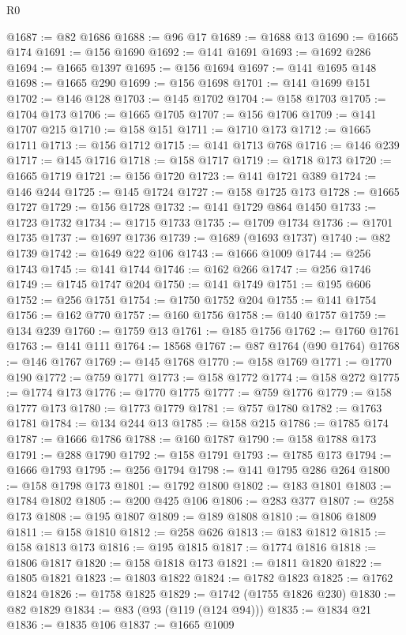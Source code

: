 \begin{lexlean}{R0}
\begin{coremodule}
@1687 := @82 @1686
@1688 := @96 @17
@1689 := @1688 @13
@1690 := @1665 @174
@1691 := @156 @1690
@1692 := @141 @1691
@1693 := @1692 @286
@1694 := @1665 @1397
@1695 := @156 @1694
@1697 := @141 @1695 @148
@1698 := @1665 @290
@1699 := @156 @1698
@1701 := @141 @1699 @151
@1702 := @146 @128
@1703 := @145 @1702
@1704 := @158 @1703
@1705 := @1704 @173
@1706 := @1665 @1705
@1707 := @156 @1706
@1709 := @141 @1707 @215
@1710 := @158 @151
@1711 := @1710 @173
@1712 := @1665 @1711
@1713 := @156 @1712
@1715 := @141 @1713 @768
@1716 := @146 @239
@1717 := @145 @1716
@1718 := @158 @1717
@1719 := @1718 @173
@1720 := @1665 @1719
@1721 := @156 @1720
@1723 := @141 @1721 @389
@1724 := @146 @244
@1725 := @145 @1724
@1727 := @158 @1725 @173
@1728 := @1665 @1727
@1729 := @156 @1728
@1732 := @141 @1729 @864 @1450
@1733 := @1723 @1732
@1734 := @1715 @1733
@1735 := @1709 @1734
@1736 := @1701 @1735
@1737 := @1697 @1736
@1739 := @1689 (@1693 @1737)
@1740 := @82 @1739
@1742 := @1649 @22 @106
@1743 := @1666 @1009
@1744 := @256 @1743
@1745 := @141 @1744
@1746 := @162 @266
@1747 := @256 @1746
@1749 := @1745 @1747 @204
@1750 := @141 @1749
@1751 := @195 @606
@1752 := @256 @1751
@1754 := @1750 @1752 @204
@1755 := @141 @1754
@1756 := @162 @770
@1757 := @160 @1756
@1758 := @140 @1757
@1759 := @134 @239
@1760 := @1759 @13
@1761 := @185 @1756
@1762 := @1760 @1761
@1763 := @141 @111
@1764 := 18568
@1767 := @87 @1764 (@90 @1764)
@1768 := @146 @1767
@1769 := @145 @1768
@1770 := @158 @1769
@1771 := @1770 @190
@1772 := @759 @1771
@1773 := @158 @1772
@1774 := @158 @272
@1775 := @1774 @173
@1776 := @1770 @1775
@1777 := @759 @1776
@1779 := @158 @1777 @173
@1780 := @1773 @1779
@1781 := @757 @1780
@1782 := @1763 @1781
@1784 := @134 @244 @13
@1785 := @158 @215
@1786 := @1785 @174
@1787 := @1666 @1786
@1788 := @160 @1787
@1790 := @158 @1788 @173
@1791 := @288 @1790
@1792 := @158 @1791
@1793 := @1785 @173
@1794 := @1666 @1793
@1795 := @256 @1794
@1798 := @141 @1795 @286 @264
@1800 := @158 @1798 @173
@1801 := @1792 @1800
@1802 := @183 @1801
@1803 := @1784 @1802
@1805 := @200 @425 @106
@1806 := @283 @377
@1807 := @258 @173
@1808 := @195 @1807
@1809 := @189 @1808
@1810 := @1806 @1809
@1811 := @158 @1810
@1812 := @258 @626
@1813 := @183 @1812
@1815 := @158 @1813 @173
@1816 := @195 @1815
@1817 := @1774 @1816
@1818 := @1806 @1817
@1820 := @158 @1818 @173
@1821 := @1811 @1820
@1822 := @1805 @1821
@1823 := @1803 @1822
@1824 := @1782 @1823
@1825 := @1762 @1824
@1826 := @1758 @1825
@1829 := @1742 (@1755 @1826 @230)
@1830 := @82 @1829
@1834 := @83 (@93 (@119 (@124 @94)))
@1835 := @1834 @21
@1836 := @1835 @106
@1837 := @1665 @1009

\end{coremodule}
\end{lexlean}
